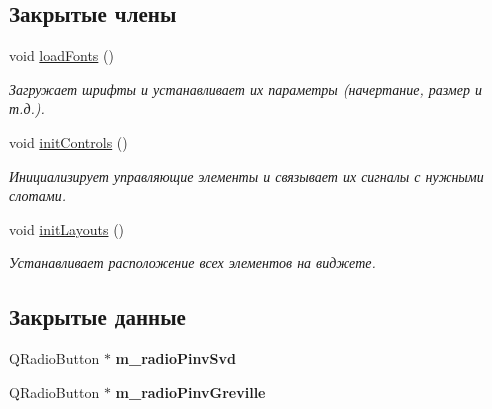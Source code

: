 \subsection*{Закрытые члены}
\begin{DoxyCompactItemize}
\item 
void \hyperlink{class_additional_settings_widget_aaa678b544facc924f555b15e5640b21a}{load\+Fonts} ()
\begin{DoxyCompactList}\small\item\em Загружает шрифты и устанавливает их параметры (начертание, размер и т.\+д.). \end{DoxyCompactList}\item 
void \hyperlink{class_additional_settings_widget_a19a4de8c860475245e1719e0bdf20a4f}{init\+Controls} ()\hypertarget{class_additional_settings_widget_a19a4de8c860475245e1719e0bdf20a4f}{}\label{class_additional_settings_widget_a19a4de8c860475245e1719e0bdf20a4f}

\begin{DoxyCompactList}\small\item\em Инициализирует управляющие элементы и связывает их сигналы с нужными слотами. \end{DoxyCompactList}\item 
void \hyperlink{class_additional_settings_widget_a60b77ac98c1d0737876007c01473badd}{init\+Layouts} ()\hypertarget{class_additional_settings_widget_a60b77ac98c1d0737876007c01473badd}{}\label{class_additional_settings_widget_a60b77ac98c1d0737876007c01473badd}

\begin{DoxyCompactList}\small\item\em Устанавливает расположение всех элементов на виджете. \end{DoxyCompactList}\end{DoxyCompactItemize}
\subsection*{Закрытые данные}
\begin{DoxyCompactItemize}
\item 
Q\+Radio\+Button $\ast$ {\bfseries m\+\_\+radio\+Pinv\+Svd}\hypertarget{class_additional_settings_widget_a9e63a721e6abd5aec1465c1a256e459a}{}\label{class_additional_settings_widget_a9e63a721e6abd5aec1465c1a256e459a}

\item 
Q\+Radio\+Button $\ast$ {\bfseries m\+\_\+radio\+Pinv\+Greville}\hypertarget{class_additional_settings_widget_aed3b5d9090f100a2ba5cd41cbf58c90a}{}\label{class_additional_settings_widget_aed3b5d9090f100a2ba5cd41cbf58c90a}

\end{DoxyCompactItemize}


